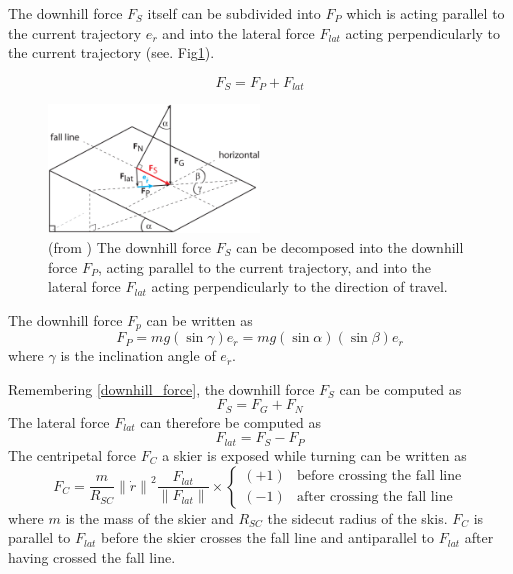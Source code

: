 \documentclass[12pt,a4paper,twoside]{book}
\newcommand{\norm}[1]{\lVert#1\rVert}
\begin{document}
The  downhill force $F_S$ itself can be subdivided into $F_P$ which is acting parallel to the current trajectory $e_{\dot{r}}$ and into the lateral force $F_{lat}$ acting perpendicularly to the current trajectory (see. Fig\ref{downhill_force_pic}).

\begin{equation}
F_S=F_P+F_{lat}
\end{equation}
\begin{figure}
  \begin{center}
    \includegraphics[width=0.5\textwidth]{images/figure5.eps}
    \caption{(from \cite{hol2012}) The downhill force $F_S$ can be decomposed into the downhill force $F_P$, acting parallel to the current trajectory, and into the lateral force $F_{lat}$ acting perpendicularly to the direction of travel.}\label{downhill_force_pic}
  \end{center}
\end{figure}

The downhill force $F_p$ can be written as
\begin{equation}
F_P=mg ( \sin \gamma ) e_{\dot{r}}=mg ( \sin \alpha ) ( \sin \beta ) e_{\dot{r}}
\end{equation}
where $\gamma$ is the inclination angle of $e_{\dot{r}}$.

Remembering \ref{downhill_force}, the downhill force $F_S$ can be computed as
\begin{equation}
F_S=F_G+F_N
\end{equation}
The lateral force $F_{lat}$ can therefore be computed as
\begin{equation}
F_{lat}=F_S-F_P
\end{equation}
The centripetal force $F_C$ a skier is exposed while turning can be written as
\begin{equation}
F_C=\frac{m}{R_{SC}} {\norm{\dot{r}}}^2 \frac{F_{lat}}{\norm{F_{lat}}} \times
\begin{cases}
  (+1) & \text{before crossing the fall line} \\
  (-1) & \text{after crossing the fall line}
  \end{cases}
\end{equation}
where $m$ is the mass of the skier and $R_{SC}$ the sidecut radius of the skis. $F_C$ is parallel to $F_{lat}$ before the skier crosses the fall line and antiparallel to $F_{lat}$ after having crossed the fall line.
\end{document}
